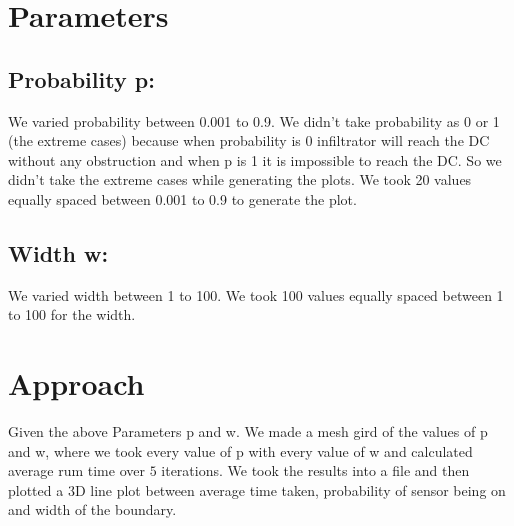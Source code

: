 \documentclass[12pt]{article}
\begin{document}

\section{Parameters}

\subsection{Probability p:}
    We varied probability between 0.001 to 0.9. We didn't take probability as 0 or 1 (the extreme cases) because when probability is 0 infiltrator will reach the DC without any obstruction and when p is 1 it is impossible to reach the DC. So we didn't take the extreme cases while generating the plots. We took 20 values equally spaced between 0.001 to 0.9 to generate the plot.
    
\subsection{Width w:}
    We varied width between 1 to 100. We took 100 values equally spaced between 1 to 100 for the width.

\section{Approach}
    Given the above Parameters p and w. We made a mesh gird of the values of p and w, where we took every value of p with every value of w and calculated average rum time over $5$ iterations. We took the results into a file and then plotted a 3D line plot between average time taken, probability of sensor being on and width of the boundary.
    
\end{document}
